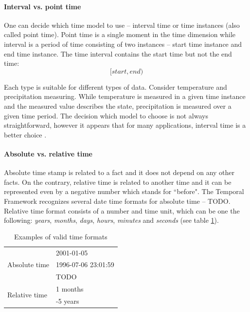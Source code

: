 \documentclass[a4paper,12pt]{book}
\newcommand{\tf}{Temporal Framework\xspace}
\begin{document}
\paragraph{Interval vs. point time}
\label{sec:intervalVsPoint}
One can decide which time model to use -- interval time or time instances (also called point time).
Point time is a single moment in the time dimension
while interval is a period of time consisting of two instances -- start time instance and end time instance.
The time interval contains the start time but not the end time:
$$[start, end)$$

Each type is suitable for different types of data.
Consider temperature and precipitation measuring.
While temperature is measured in a given time instance and the measured value describes the state,
precipitation is measured over a given time period. The decision which model to choose is not always
straightforward, however it appears that for many applications,
interval time is a better choice \cite{pointVsInterval}.

\paragraph{Absolute vs. relative time}
\label{sec:absoluteVsRelative}
Absolute time stamp is related to a fact and it does not depend on any other facts.
On the contrary, relative time is related to another time and
it can be represented even by a negative number which stands for ``before".
The \tf recognizes several date time formats for absolute time -- TODO.
Relative time format consists of a number and time unit, which can be one the following: \emph{years},
\emph{months}, \emph{days}, \emph{hours}, \emph{minutes} and \emph{seconds} (see table \ref{tab:timeFormat}).

\begin{table}[ht!]
  \centering
\caption{Examples of valid time formats}
\label{tab:timeFormat}
\setlength{\extrarowheight}{3pt}
\begin{tabular}{|l|l|}
\hline
\multirow{3}{*}{Absolute time}
 & 2001-01-05  \\ \cline{2-2}
 & 1996-07-06 23:01:59  \\\cline{2-2}
 & TODO  \\
 \hline
\multirow{2}{*}{Relative time}
 & 1 months  \\\cline{2-2}
 & -5 years  \\
 \hline
\end{tabular}
\end{table}
\end{document}
